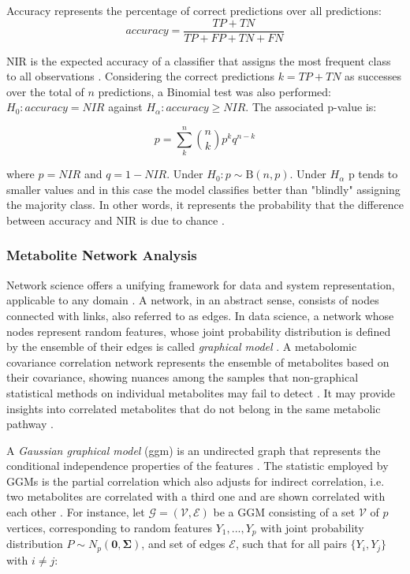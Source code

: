 \documentclass{amsart}
\begin{document}
Accuracy represents the percentage of correct predictions over all predictions: 
\[ accuracy = \frac{TP+TN}{TP+FP+TN+FN}\]

NIR is the expected accuracy of a classifier that assigns the most frequent class to all observations \cite{Kuhn2008BuildingPackage}. Considering the correct predictions $k =TP+TN$ as successes over the total of $n$ predictions, a Binomial test was also performed: $H_0: accuracy = NIR$ against $H_\alpha: accuracy \geq NIR$. The associated p-value is:

\[p = \sum_{k}^n \binom{n}{k} p^k q^{n-k}\]

where $p=NIR$ and $q=1-NIR$. Under $H_0: p \sim \mathrm{B}(n,p)$. Under $H_\alpha$ p tends to smaller values and in this case the model classifies better than "blindly" assigning the majority class. In other words, it represents the probability that the difference between accuracy and NIR is due to chance \cite{NIR2023}.

\subsubsection{Metabolite Network Analysis}\label{rq3}
Network science offers a unifying framework for data and system representation, applicable to any domain \cite{Barabasi2015NetworkScience}. A network, in an abstract sense, consists of nodes connected with links, also referred to as edges. In data science, a network whose nodes represent random features, whose joint probability distribution is defined by the ensemble of their edges is called \textit{graphical model} \cite{Peeters2022Rags2ridges:Matrices}. A metabolomic covariance correlation network represents the ensemble of metabolites based on their covariance, showing nuances among the samples that non-graphical statistical methods on individual metabolites may fail to detect \cite{PerezDeSouza2020Network-basedInterpretation}. It may provide insights into correlated metabolites that do not belong in the same metabolic pathway \cite{PerezDeSouza2020Network-basedInterpretation}.


A \textit{Gaussian graphical model} (\acrshort{ggm}) is an undirected graph that represents the conditional independence properties of the features \cite{KollerProbabilisticTechniques}. The statistic employed by GGMs is the partial correlation which also adjusts for indirect correlation, i.e. two metabolites are correlated with a third one and are shown correlated with each other \cite{Amara2022NetworksInterpretation}. For instance, let $\mathcal{G=(V,E)}$ be a GGM consisting of a set $\mathcal{V}$ of $p$ vertices, corresponding to random features $Y_1,...,Y_p$ with joint probability distribution $P \sim N_p(\mathbf{0, \Sigma})$, and set of edges $\mathcal{E}$, such that for all pairs $\{Y_i , Y_j\}$ with $i\neq j$:
\end{document}
